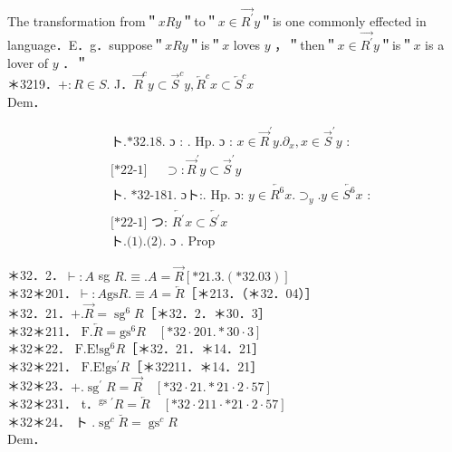 \documentclass[10pt]{article}
\begin{document}
The transformation from＂$x R y$＂to＂$x \in \overrightarrow{R^{\prime}} y$＂is one commonly effected in language．E．g．suppose＂$x R y$＂is＂$x$ loves $y$ ，＂then＂$x \in \overrightarrow{R^{\prime}} y$＂is＂$x$ is a lover of $y$ ．＂\\
＊3219．$+: R \in S$. J．$\vec{R}^{c} y \subset \vec{S}^{c} y, \overleftarrow{R}^{c} x \subset \overleftarrow{S}^{c} x$\\
Dem．


\begin{align*}
& \text { ト.*32.18. ɔ : . Hp. ɔ : } x \in \vec{R}^{\prime} y . \partial_{x}, x \in \vec{S}^{\prime} y \text { : } \\
& \text { [*22-1] } \quad \supset: \vec{R}^{\prime} y \subset \vec{S}^{\prime} y  \tag{1}\\
& \text { ト. *32-181. ɔト:. Hp. ɔ: } y \in \overleftarrow{R^{6}} x . \supset_{y} . y \in \overleftarrow{S^{6}} x \text { : } \\
& \text { [*22-1] つ: } \overleftarrow{R^{\prime}} x \subset \overleftarrow{S^{\prime}} x  \tag{2}\\
& \text { ト.(1).(2). ɔ } . \text { Prop }
\end{align*}


＊32．2．$\vdash: A$ sg $R . \equiv . A=\vec{R}[* 21.3 .(* 32.03)]$\\
＊32＊201．$\vdash: A \mathrm{gs} R . \equiv A=\overleftarrow{R}$［＊213．（＊32．04）］\\
＊32．21．$+. \vec{R}=\operatorname{sg}^{6} R$［＊32．2．＊30．3］\\
＊32＊211． $\mathrm{F} . \overleftarrow{R}=\mathrm{gs}^{6} R \quad[* 32 \cdot 201 . * 30 \cdot 3]$\\
＊32＊22． $\mathrm{F} . \mathrm{E}!\mathrm{sg}^{6} R$［＊32．21．＊14．21］\\
＊32＊221． $\mathrm{F} . \mathrm{E}!\mathrm{gs}^{\prime} R$［＊32211．＊14．21］\\
＊32＊23．$+. \operatorname{sg}^{\prime} R=\vec{R} \quad[* 32 \cdot 21 . * 21 \cdot 2 \cdot 57]$\\
＊32＊231． t．$^{\text {gs }}{ }^{\prime} R=\overleftarrow{R} \quad[* 32 \cdot 211 \cdot * 21 \cdot 2 \cdot 57]$\\
＊32＊24． ト $. \operatorname{sg}^{c} \breve{R}=\operatorname{gs}^{c} R$\\
Dem．
\end{document}
